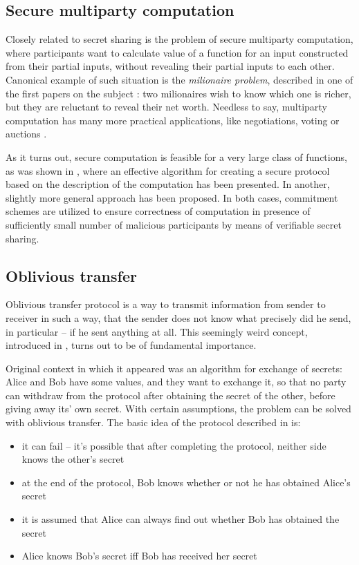 \documentclass[10pt]{article}
\begin{document}
\subsection{Secure multiparty computation}

Closely related to secret sharing is the problem of secure multiparty computation, where participants
want to calculate value of a function for an input constructed from their partial inputs, without
revealing their partial inputs to each other. Canonical example of such situation is the \emph{milionaire
problem}, described in one of the first papers on the subject \cite{Yao}: two milionaires wish to
know which one is richer, but they are reluctant to reveal their net worth. Needless to say, multiparty
computation has many more practical applications, like negotiations, voting or auctions \cite{grigoriev}.

As it turns out, secure computation is feasible for a very large class of functions, as was shown in
\cite{Goldreich87}, where an effective algorithm for creating a secure protocol based on the description
of the computation has been presented. In \cite{Chaum88} another, slightly more general approach has
been proposed. In both cases, commitment schemes are utilized to ensure correctness of computation in
presence of sufficiently small number of malicious participants by means of verifiable secret sharing. 

\subsection{Oblivious transfer}

Oblivious transfer protocol is a way to transmit information from sender to receiver in such a way,
that the sender does not know what precisely did he send, in particular -- if he sent anything at all.
This seemingly weird concept, introduced in \cite{Rabin81}, turns out to be of fundamental importance.

Original context in which it appeared was an algorithm for exchange of secrets: Alice and Bob have some
values, and they want to exchange it, so that no party can withdraw from the protocol after obtaining
the secret of the other, before giving away its' own secret. With certain assumptions, the problem
can be solved with oblivious transfer. The basic idea of the protocol described in \cite{Rabin81} is:

\begin{itemize}
  \item it can fail -- it's possible that after completing the protocol, neither side knows 
    the other's secret
  \item at the end of the protocol, Bob knows whether or not he has obtained Alice's secret
  \item it is assumed that Alice can always find out whether Bob has obtained the secret
  \item Alice knows Bob's secret iff Bob has received her secret
\end{itemize}
\end{document}
